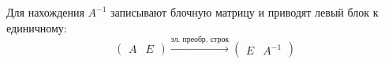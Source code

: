 \begin{example}
Для нахождения $A^{-1}$ записывают блочную матрицу и приводят левый блок к единичному:
$$
\left( \begin{array}{c|c}
A & E
\end{array} \right) 
\xrightarrow{\text{эл. преобр. строк}} 
\left( \begin{array}{c|c}
E & A^{-1}
\end{array} \right)
$$
\end{example}
